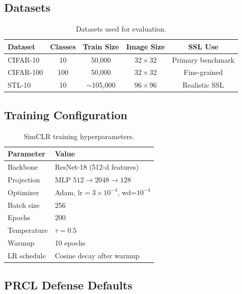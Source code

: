 \documentclass[11pt,a4paper]{article}
\begin{document}
\subsection{Datasets}

\begin{table}[h]
\centering
\caption{Datasets used for evaluation.}
\begin{tabular}{@{}lcccc@{}}
\toprule
\textbf{Dataset} & \textbf{Classes} & \textbf{Train Size} & \textbf{Image Size} & \textbf{SSL Use} \\
\midrule
CIFAR-10  & 10  & 50{,}000  & $32\!\times\!32$  & Primary benchmark \\
CIFAR-100 & 100 & 50{,}000  & $32\!\times\!32$  & Fine-grained \\
STL-10    & 10  & $\sim$105{,}000 & $96\!\times\!96$ & Realistic SSL \\
\bottomrule
\end{tabular}
\end{table}

\subsection{Training Configuration}

\begin{table}[h]
\centering
\caption{SimCLR training hyperparameters.}
\begin{tabular}{@{}ll@{}}
\toprule
\textbf{Parameter} & \textbf{Value} \\
\midrule
Backbone      & ResNet-18 (512-d features) \\
Projection    & MLP $512\to2048\to128$ \\
Optimizer     & Adam, $\text{lr}=3\!\times\!10^{-4}$, wd=$10^{-4}$ \\
Batch size    & 256 \\
Epochs        & 200 \\
Temperature   & $\tau=0.5$ \\
Warmup        & 10 epochs \\
LR schedule   & Cosine decay after warmup \\
\bottomrule
\end{tabular}
\end{table}

\subsection{PRCL Defense Defaults}
\end{document}
